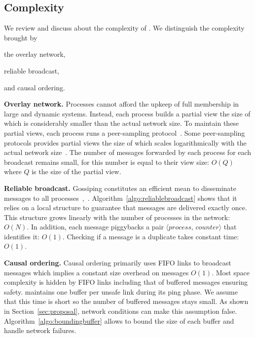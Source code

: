 \subsection{Complexity}
\label{subsec:complexity}

We review and discuss about the complexity of \CBROADCAST. We distinguish the
complexity brought by 
\begin{inparaenum}[(i)]
\item the overlay network,
\item reliable broadcast,
\item and causal ordering.
\end{inparaenum}

\noindent \textbf{Overlay network.} Processes cannot afford the upkeep of full
membership in large and dynamic systems. Instead, each process builds a partial
view the size of which is considerably smaller than the actual network size.  To
maintain these partial views, each process runs a peer-sampling
protocol~\cite{bertier-d2ht,jelasity2007gossip,jelasity2009tman}.  Some
peer-sampling protocols provides partial views the size of which scales
logarithmically with the actual network size~\cite{nedelec2017adaptive}.  The
number of messages forwarded by each process for each broadcast remains small,
for this number is equal to their view size: $O(Q)$ where $Q$ is the size of the
partial view.


\noindent \textbf{Reliable broadcast.} Gossiping constitutes an efficient mean
to disseminate messages to all
processes~\cite{demers1987epidemic},~\cite{birman1999bimodal}.
Algorithm~\ref{algo:reliablebroadcast} shows that it relies on a local structure
to guarantee that messages are delivered exactly once. This structure grows
linearly with the number of processes in the network: $O(N)$. In addition, each
message piggybacks a pair $\langle process,\, counter \rangle$ that identifies
it: $O(1)$. Checking if a message is a duplicate takes constant time: $O(1)$.

\noindent \textbf{Causal ordering.} Causal ordering primarily uses FIFO links to
broadcast messages which implies a constant size overhead on messages
$O(1)$. Most space complexity is hidden by FIFO links including that of buffered
messages ensuring safety.
\CBROADCAST maintains one buffer per unsafe link during its ping phase.  We
assume that this time is short so the number of buffered messages stays
small. As shown in Section~\ref{sec:proposal}, network conditions can make this
assumption false. Algorithm~\ref{algo:boundingbuffer} allows to bound the size
of each buffer and handle network failures.


